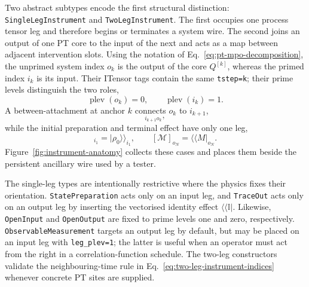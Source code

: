 Two abstract subtypes encode the first structural distinction: \texttt{SingleLegInstrument} and \texttt{TwoLegInstrument}.
The first occupies one process tensor leg and therefore begins or terminates a system wire.
The second joins an output of one PT core to the input of the next and acts as a map between adjacent intervention slots.
Using the notation of Eq.~\eqref{eq:pt-mpo-decomposition}, the unprimed system index \(o_k\) is the output of the core \(Q^{[k]}\), whereas the primed index \(i_k\) is its input.
Their ITensor tags contain the same \texttt{tstep=k}; their prime levels distinguish the two roles,
%
\begin{equation}
    \operatorname{plev}(o_k)=0, \qquad \operatorname{plev}(i_k)=1.
    \label{eq:instrument-prime-convention}
\end{equation}
%
A between-attachment at anchor \(k\) connects \(o_k\) to \(i_{k+1}\),
%
\begin{equation}
    [\mathcal A_k]_{i_{k+1} o_k},
    \label{eq:two-leg-instrument-indices}
\end{equation}
%
while the initial preparation and terminal effect have only one leg,
%
\begin{equation}
    [\mathcal P_{\rho_0}]_{i_1}=\lvert\rho_0\rangle\!\rangle_{i_1}, \qquad [\mathcal M]_{o_{N}}=\langle\!\langle M\rvert_{o_{N}}.
    \label{eq:single-leg-instrument-indices}
\end{equation}
%
Figure~\ref{fig:instrument-anatomy} collects these cases and places them beside the persistent ancillary wire used by a tester.

The single-leg types are intentionally restrictive where the physics fixes their orientation.
\texttt{StatePreparation} acts only on an input leg, and \texttt{TraceOut} acts only on an output leg by inserting the vectorised identity effect \(\langle\!\langle\mathbb I\rvert\).
Likewise, \texttt{OpenInput} and \texttt{OpenOutput} are fixed to prime levels one and zero, respectively.
\texttt{ObservableMeasurement} targets an output leg by default, but may be placed on an input leg with \texttt{leg\_plev=1}; the latter is useful when an operator must act from the right in a correlation-function schedule.
The two-leg constructors validate the neighbouring-time rule in Eq.~\eqref{eq:two-leg-instrument-indices} whenever concrete PT sites are supplied.

